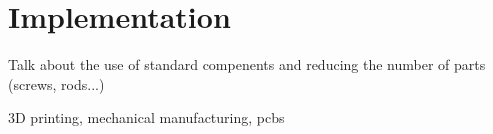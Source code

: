 \chapter{Implementation} %
\label{cha:implementation}

Talk about the use of standard compenents and reducing the number of parts (screws, rods...)

3D printing, mechanical manufacturing, pcbs









